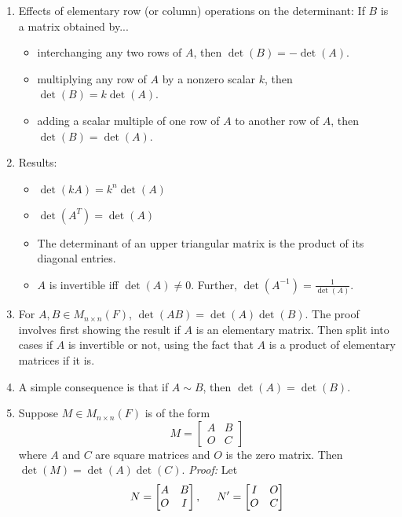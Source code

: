 \documentclass[10pt]{article}
\begin{document}
\begin{multicols*}{2}
\begin{enumerate}
\begin{enumerate}
        \item Effects of elementary row (or column) operations on the determinant: If $B$ is a matrix obtained by...
        \begin{itemize}
            \item interchanging any two rows of $A$, then $\det(B) = - \det(A)$.
            \item multiplying any row of $A$ by a nonzero scalar $k$, then $\det(B) = k\det(A)$.
            \item adding a scalar multiple of one row of $A$ to another row of $A$, then $\det(B)=\det(A)$.
        \end{itemize}
        \item Results:
        \begin{itemize}
            \item $\det(kA) = k^n\det(A)$
            \item $\det(A^T) = \det(A)$
            \item The determinant of an upper triangular matrix is the product of its diagonal entries.
            \item $A$ is invertible iff $\det(A) \neq 0$. Further, $\det(A^{-1}) = \frac{1}{\det(A)}$.
        \end{itemize}
        \item For $A,B \in M_{n \times n}(F)$, $\det(AB) = \det(A)\det(B)$. The proof involves first showing the result if $A$ is an elementary matrix. Then split into cases if $A$ is invertible or not, using the fact that $A$ is a product of elementary matrices if it is.
        \item A simple consequence is that if $A \sim B$, then $\det(A) = \det(B)$.
        \item Suppose $M \in M_{n \times n}(F)$ is of the form
        $$M = \begin{bmatrix} A & B \\ O & C \end{bmatrix}$$ where $A$ and $C$ are square matrices and $O$ is the zero matrix. Then $\det(M) = \det(A)\det(C)$. \textit{Proof:} Let 
        \begin{align*}
            N = \begin{bmatrix} A & B \\ O & I \end{bmatrix}, \hspace{5mm} N' = \begin{bmatrix} I & O \\ O & C \end{bmatrix}

\end{align*}
\end{enumerate}
\end{enumerate}
\end{multicols*}
\end{document}
